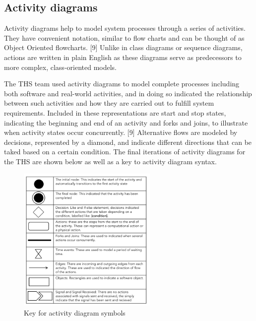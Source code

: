 \documentclass[fontsize=11pt]{extarticle}
\numberwithin{figure}{section} %
\numberwithin{table}{section}%
\begin{document}
\hypertarget{activity-diagrams}{%
\subsection{Activity diagrams}\label{activity-diagrams}}

Activity diagrams help to model system processes through a series of
activities. They have convenient notation, similar to flow charts and
can be thought of as Object Oriented flowcharts. {[}9{]} Unlike in class
diagrams or sequence diagrams, actions are written in plain English as
these diagrams serve as predecessors to more complex, class-oriented
models.

The THS team used activity diagrams to model complete processes
including both software and real-world activities, and in doing so
indicated the relationship between such activities and how they are
carried out to fulfill system requirements. Included in these
representations are start and stop states, indicating the beginning and
end of an activity and forks and joins, to illustrate when activity
states occur concurrently. {[}9{]} Alternative flows are modeled by
decisions, represented by a diamond, and indicate different directions
that can be taked based on a certain condition. The final iterations of
activity diagrams for the THS are shown below as well as a key to
activity diagram syntax.

\begin{figure}[H]
      \centering
      \includegraphics[trim = 0 0 0 0, clip, width=0.6\textwidth]{TempImg/ADKey.png}
      \caption{Key for activity diagram symbols}
 \end{figure}
\end{document}
